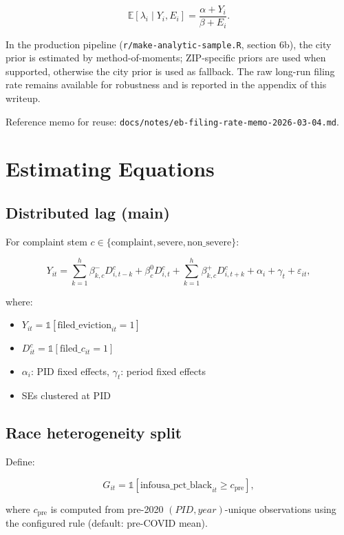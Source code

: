 \documentclass[
  11pt,
]{article}
\providecommand{\tightlist}{%
  \setlength{\itemsep}{0pt}\setlength{\parskip}{0pt}}
\begin{document}
\[
\mathbb{E}[\lambda_i\mid Y_i,E_i]=\frac{\alpha+Y_i}{\beta+E_i}.
\]

In the production pipeline (\texttt{r/make-analytic-sample.R}, section
6b), the city prior is estimated by method-of-moments; ZIP-specific
priors are used when supported, otherwise the city prior is used as
fallback. The raw long-run filing rate remains available for robustness
and is reported in the appendix of this writeup.

Reference memo for reuse:
\texttt{docs/notes/eb-filing-rate-memo-2026-03-04.md}.

\newpage

\section{Estimating Equations}\label{estimating-equations}

\subsection{Distributed lag (main)}\label{distributed-lag-main}

For complaint stem
\(c \in \{\text{complaint},\text{severe},\text{non\_severe}\}\):

\[
Y_{it}
=
\sum_{k=1}^{h}\beta^{-}_{k,c} D^c_{i,t-k}
+ \beta^{0}_{c} D^c_{i,t}
+ \sum_{k=1}^{h}\beta^{+}_{k,c} D^c_{i,t+k}
+ \alpha_i + \gamma_t + \varepsilon_{it},
\]

where:

\begin{itemize}
\tightlist
\item
  \(Y_{it}=\mathbb{1}[\text{filed\_eviction}_{it}=1]\)
\item
  \(D^c_{it}=\mathbb{1}[\text{filed\_}c_{it}=1]\)
\item
  \(\alpha_i\): PID fixed effects, \(\gamma_t\): period fixed effects
\item
  SEs clustered at PID
\end{itemize}

\subsection{Race heterogeneity split}\label{race-heterogeneity-split}

Define:

\[
G_{it}=\mathbb{1}[\text{infousa\_pct\_black}_{it} \ge c_{\text{pre}}],
\]

where \(c_{\text{pre}}\) is computed from pre-2020 \((PID,year)\)-unique
observations using the configured rule (default: pre-COVID mean).
\end{document}
